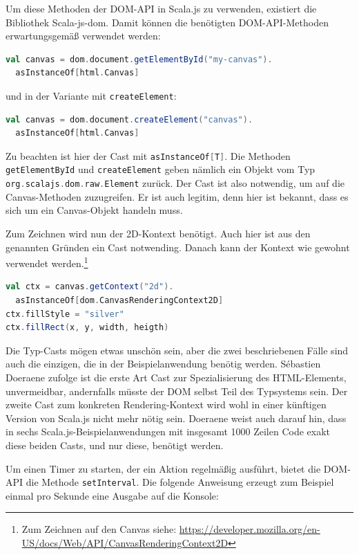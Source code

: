 \documentclass[a4paper, 12pt, hidelinks, listof=totoc, listoftables=totoc, bibliography=totoc]{scrreprt}
\newcommand{\scala}[1]{\lstinline[language=Scala, style=inline]|#1|}
\begin{document}
Um diese Methoden der \ac{DOM}-\ac{API} in Scala.js zu verwenden, existiert die Bibliothek Scala-js-dom. Damit können die benötigten \ac{DOM}-\ac{API}-Methoden erwartungsgemäß verwendet werden:

\begin{lstlisting}[language=Scala, style=snippet]
val canvas = dom.document.getElementById("my-canvas").
  asInstanceOf[html.Canvas]
\end{lstlisting}

und in der Variante mit \scala{createElement}:

\begin{lstlisting}[language=Scala, style=snippet]
val canvas = dom.document.createElement("canvas").
  asInstanceOf[html.Canvas]
\end{lstlisting}

Zu beachten ist hier der Cast mit \scala{asInstanceOf[T]}. Die Methoden \scala{getElementById} und \scala{createElement}
geben nämlich ein Objekt vom Typ \scala{org.scalajs.dom.raw.Element} zurück. Der Cast ist also notwendig, um auf die Canvas-Methoden zuzugreifen. Er ist auch legitim, denn hier ist bekannt, dass es sich um ein Canvas-Objekt handeln muss.

Zum Zeichnen wird nun der 2D-Kontext benötigt. Auch hier ist aus den genannten Gründen ein Cast notwending. Danach kann der Kontext wie gewohnt verwendet werden.\footnote{Zum Zeichnen auf den Canvas siehe: \url{https://developer.mozilla.org/en-US/docs/Web/API/CanvasRenderingContext2D}}

\begin{lstlisting}[language=Scala, style=snippet]
val ctx = canvas.getContext("2d").
  asInstanceOf[dom.CanvasRenderingContext2D]
ctx.fillStyle = "silver"
ctx.fillRect(x, y, width, heigth)
\end{lstlisting}

Die Typ-Casts mögen etwas unschön sein, aber die zwei beschriebenen Fälle sind auch die einzigen, die in der Beispielanwendung benötig werden. Sébastien Doeraene zufolge ist die erste Art Cast zur Spezialisierung des \ac{HTML}-Elements, unvermeidbar, andernfalls müsste der \ac{DOM} selbst Teil des Typsystems sein. Der zweite Cast zum konkreten Rendering-Kontext wird wohl in einer künftigen Version von Scala.js nicht mehr nötig sein. Doeraene weist auch darauf hin, dass in sechs Scala.js-Beispielanwendungen mit insgesamt 1000 Zeilen Code exakt diese beiden Casts, und nur diese, benötigt werden.\cite[S. 8]{doeraene2013.TDI}

Um einen Timer zu starten, der ein Aktion regelmäßig ausführt, bietet die \ac{DOM}-\ac{API} die Methode \scala{setInterval}. Die folgende Anweisung erzeugt zum Beispiel einmal pro Sekunde eine Ausgabe auf die Konsole:
\end{document}

